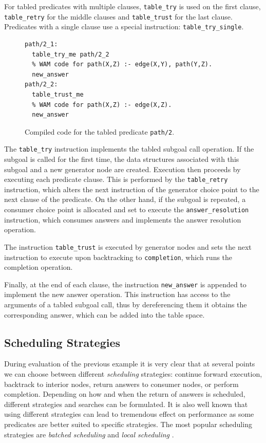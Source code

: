 For tabled predicates with multiple clauses, \texttt{table\_try} is used on the first clause,
\texttt{table\_retry} for the middle clauses and \texttt{table\_trust} for the last clause.
Predicates with a single clause use a special instruction: \texttt{table\_try\_single}.

\begin{figure}[ht]
\begin{Verbatim}
path/2_1:
  table_try_me path/2_2
  % WAM code for path(X,Z) :- edge(X,Y), path(Y,Z).
  new_answer
path/2_2:
  table_trust_me
  % WAM code for path(X,Z) :- edge(X,Z).
  new_answer
\end{Verbatim}
\caption{Compiled code for the tabled predicate \texttt{path/2}.}
\label{fig:compiled_tabled_path}
\end{figure}

The \texttt{table\_try} instruction implements the tabled subgoal call operation. If the subgoal is called
for the first time, the data structures associated with this subgoal and a new generator node are created.
Execution then proceeds by executing each predicate clause. This is performed by the \texttt{table\_retry}
instruction, which alters the next instruction of the generator choice point to the next clause of the predicate.
On the other hand, if the subgoal is repeated, a consumer choice point is allocated and set to execute the
\texttt{answer\_resolution} instruction, which consumes answers and implements the answer resolution operation.

The instruction \texttt{table\_trust} is executed by generator nodes and sets the next
instruction to execute upon backtracking to
\texttt{completion}, which runs the completion operation.

Finally, at the end of each clause, the instruction \texttt{new\_answer} is appended to implement
the new answer operation. This instruction has access to the arguments of a tabled subgoal call,
thus by dereferencing them it obtains the corresponding answer, which can be added into the table space.    

\subsection{Scheduling Strategies}\label{sec:scheduling}

During evaluation of the previous example it is very clear that at several points we can choose between
different \textit{scheduling} strategies: continue forward execution, backtrack to interior nodes,
return answers to consumer nodes, or perform completion. Depending on how and when the return of answers
is scheduled, different strategies and searches can be formulated. It is also well known that using
different strategies can lead to tremendous effect on performance as some predicates are better suited to specific strategies. 
The most popular scheduling strategies are \textit{batched scheduling} and \textit{local scheduling} \cite{Freire-96}.


